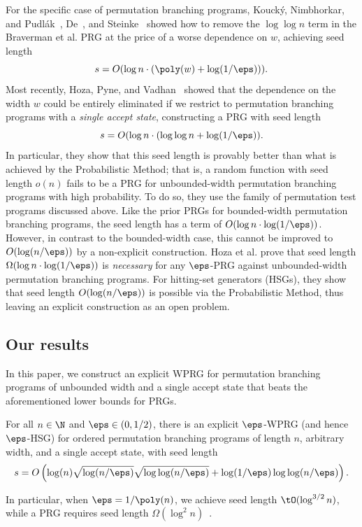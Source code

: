 	For the specific case of permutation branching programs, Kouck{\'y}, Nimbhorkar, and Pudl{\'a}k~\cite{KouckyNiPu11}, De~\cite{De11}, and Steinke~\cite{Steinke12}
	showed how to remove the $\log\log n$ term in the Braverman et al. PRG at the price of a worse dependence on $w$, achieving seed length
	$$s=O(\log n\cdot(\poly(w)+\log(1/\eps))).$$
	Most recently, Hoza, Pyne, and Vadhan~\cite{HozaPyVa21} showed that the dependence on the width $w$ could be entirely eliminated if we restrict to permutation branching programs with a \emph{single accept state}, constructing a PRG with seed length
	$$s=O(\log n\cdot (\log\log n+\log(1/\eps)).$$
	In particular, they show that this	seed length is provably better than what is achieved by the Probabilistic Method; that is, a random function with seed length $o(n)$ fails to be a PRG for unbounded-width permutation branching programs with high probability. To do so, they use the family of permutation test programs discussed above.
	Like the prior PRGs for bounded-width permutation branching programs, the seed length has a term of $O(\log n\cdot \log(1/\eps))$.  However, in contrast to the bounded-width case, this cannot be improved to $O(\log(n/\eps))$ by a non-explicit construction.  Hoza et al. prove that seed length $\Omega(\log n \cdot \log(1/\eps))$ is \emph{necessary} for any $\eps$-PRG against unbounded-width permutation branching programs.  For hitting-set generators (HSGs), they show that seed length $O(\log(n/\eps))$ is possible via the Probabilistic Method, thus leaving an explicit construction as an open problem. 
	
\subsection{Our results}
In this paper, we construct an explicit WPRG for permutation branching programs of unbounded width and a single accept state that beats the aforementioned lower bounds for PRGs. %

\begin{theorem}
\label{thm:cycle}
For all $n\in \N$ and $\eps \in (0,1/2)$, there is an explicit $\eps$-WPRG (and hence $\eps$-HSG) for ordered permutation branching 
programs of length $n$, arbitrary width, and a single accept state, with seed length
$$s=O\left(\log(n)\sqrt{\log(n/\eps)}\sqrt{\log\log(n/\eps)}+\log(1/\eps)\log\log(n/\eps)\right).$$
\end{theorem}
In particular, when $\eps=1/\poly(n)$, we achieve seed length $\tO(\log^{3/2} n)$, while
a PRG requires seed length $\Omega(\log^2 n)$~\cite{HozaPyVa21}.

